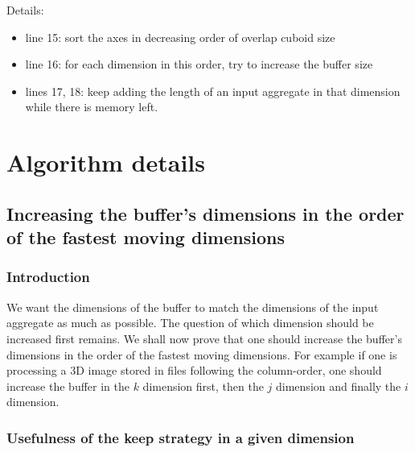 \documentclass[conference]{IEEEtran}
\begin{document}
Details:
\begin{itemize}
  \item line 15: sort the axes in decreasing order of overlap cuboid size
  \item line 16: for each dimension in this order, try to increase the buffer size
  \item lines 17, 18: keep adding the length of an input aggregate in that dimension while there is memory left.
\end{itemize}

\section*{Algorithm details}

\subsection{Increasing the buffer's dimensions in the order of the fastest moving dimensions}

\subsubsection{Introduction}
We want the dimensions of the buffer to match the dimensions of the input aggregate as much as possible.
The question of which dimension should be increased first remains.
We shall now prove that one should increase the buffer's dimensions in the order of the fastest moving dimensions.
For example if one is processing a 3D image stored in files following the column-order, one should increase the buffer in the $k$ dimension first, then the $j$ dimension and finally the $i$ dimension.

\subsubsection{Usefulness of the keep strategy in a given dimension}
\end{document}
